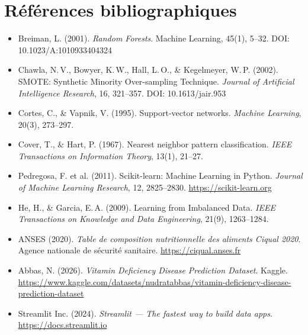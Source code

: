 \documentclass[12pt,a4paper]{article}
\begin{document}
\section*{Références bibliographiques}

\begin{itemize}[leftmargin=2em,label={[}]
    \item[] Breiman, L. (2001). \emph{Random Forests}. Machine Learning, 45(1), 5–32.
        DOI: 10.1023/A:1010933404324

    \item[] Chawla, N.\,V., Bowyer, K.\,W., Hall, L.\,O., \& Kegelmeyer, W.\,P. (2002).
        SMOTE: Synthetic Minority Over-sampling Technique.
        \emph{Journal of Artificial Intelligence Research}, 16, 321–357.
        DOI: 10.1613/jair.953

    \item[] Cortes, C., \& Vapnik, V. (1995). Support-vector networks.
        \emph{Machine Learning}, 20(3), 273–297.

    \item[] Cover, T., \& Hart, P. (1967). Nearest neighbor pattern classification.
        \emph{IEEE Transactions on Information Theory}, 13(1), 21–27.

    \item[] Pedregosa, F. et al. (2011). Scikit-learn: Machine Learning in Python.
        \emph{Journal of Machine Learning Research}, 12, 2825–2830.
        \url{https://scikit-learn.org}

    \item[] He, H., \& Garcia, E.\,A. (2009). Learning from Imbalanced Data.
        \emph{IEEE Transactions on Knowledge and Data Engineering}, 21(9), 1263–1284.

    \item[] ANSES (2020). \emph{Table de composition nutritionnelle des aliments
        Ciqual 2020}. Agence nationale de sécurité sanitaire.
        \url{https://ciqual.anses.fr}

    \item[] Abbas, N. (2026). \emph{Vitamin Deficiency Disease Prediction Dataset}.
        Kaggle. \url{https://www.kaggle.com/datasets/nudratabbas/vitamin-deficiency-disease-prediction-dataset}

    \item[] Streamlit Inc. (2024). \emph{Streamlit — The fastest way to build data apps}.
        \url{https://docs.streamlit.io}
\end{itemize}
\end{document}
